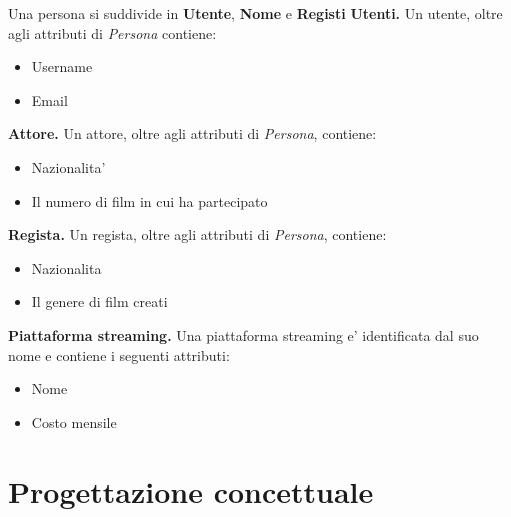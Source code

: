 \documentclass[10pt,a4paper]{article}
\begin{document}
Una persona si suddivide in \textbf{Utente}, \textbf{Nome} e \textbf{Registi}\newline\newline
\textbf{Utenti.} Un utente, oltre agli attributi di \textit{Persona} contiene:
\begin{itemize}
    \item Username
    \item Email
\end{itemize}
\textbf{Attore.} Un attore, oltre agli attributi di \textit{Persona}, contiene:
\begin{itemize}
    \item Nazionalita'
    \item Il numero di film in cui ha partecipato
\end{itemize}
\textbf{Regista.} Un regista, oltre agli attributi di \textit{Persona}, contiene:
\begin{itemize}
    \item Nazionalita
    \item Il genere di film creati
\end{itemize}
\textbf{Piattaforma streaming.} Una piattaforma streaming e' identificata dal suo nome e contiene i seguenti attributi:
\begin{itemize}
    \item Nome 
    \item Costo mensile
\end{itemize}
\section{Progettazione concettuale}
\end{document}
